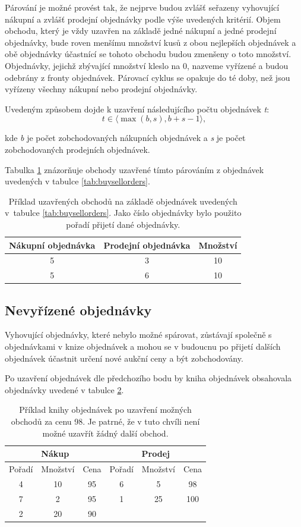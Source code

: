 \documentclass[thesis=M,czech]{FITthesis}[2012/06/26]
\begin{document}
Párování je možné provést tak, že nejprve budou zvlášť seřazeny vyhovující nákupní a zvlášť prodejní objednávky podle výše uvedených 
kritérií. Objem obchodu, který je vždy uzavřen na základě jedné nákupní a jedné prodejní objednávky, bude roven menšímu množství
kusů z obou nejlepších objednávek a obě objednávky účastnící se tohoto obchodu budou zmenšeny o toto množství. Objednávky, jejichž
zbývající množství kleslo na 0, nazveme vyřízené a budou odebrány z fronty objednávek. Párovací cyklus se opakuje do té doby, než
jsou vyřízeny všechny nákupní nebo prodejní objednávky.

Uvedeným způsobem dojde k uzavření následujícího počtu objednávek \textit{t}:
\[t \in \langle \max(b, s), b + s - 1 \rangle,\] 

kde \textit{b} je počet zobchodovaných nákupních objednávek a \textit{s} je počet zobchodovaných prodejních objednávek.

Tabulka \ref{tab:orderstotrades} znázorňuje obchody uzavřené tímto párováním z objednávek uvedených v tabulce \ref{tab:buysellorders}.

\begin{table}\centering
	\begin{tabular}{|c|c|c|}\hline
		Nákupní objednávka	& Prodejní objednávka	& Množství	\tabularnewline \hline \hline
		5				& 3				& 10		\tabularnewline \hline
		5				& 6				& 10		\tabularnewline \hline
	\end{tabular}
	\caption[Příklad uzavřených obchodů]{Příklad uzavřených obchodů na základě objednávek uvedených v~tabulce \ref{tab:buysellorders}. 
			Jako číslo objednávky bylo použito pořadí přijetí dané objednávky.}
	\label{tab:orderstotrades}
\end{table}


\subsection{Nevyřízené objednávky}

Vyhovující objednávky, které nebylo možné spárovat, zůstávají společně s~ objednávkami v knize objednávek a mohou se
v budoucnu po přijetí dalších objednávek účastnit určení nové aukční ceny a být zobchodovány. 

Po uzavření objednávek dle předchozího bodu by kniha objednávek obsahovala objednávky uvedené v tabulce \ref{tab:restorders}.

\begin{table}\centering
	\begin{tabular}{|c|c|c||c|c|c|}\hline
		\multicolumn{3}{|c||}{Nákup}  & \multicolumn{3}{c|}{Prodej} \tabularnewline \hline 
		Pořadí	 	& Množství	& Cena	& Pořadí	& Množství	& Cena	\tabularnewline \hline \hline
		4		& 10		& 95		& 6		& 5		& 98		\tabularnewline \hline
		7		& 2		& 95		& 1		& 25		& 100		\tabularnewline \hline
		2		& 20		& 90		& 		& 		& 		\tabularnewline \hline
	\end{tabular}
	\caption[Příklad zbývajících objednávek]{Příklad knihy objednávek po uzavření možných obchodů za cenu 98. Je patrné, že v tuto
			chvíli není možné uzavřít žádný další obchod.}
	\label{tab:restorders}
\end{table}
\end{document}
